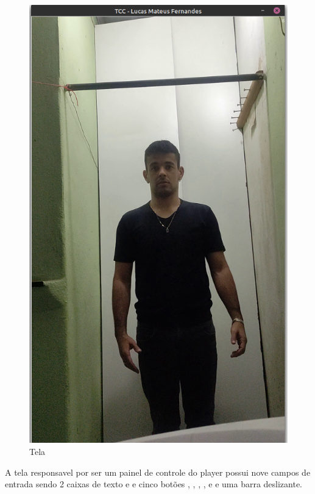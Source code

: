 \begin{figure}[H]
	\centering
	\caption{Tela }
	\includegraphics[scale=0.25]{figuras/view/player.png}
\end{figure}


A tela responsavel por ser um painel de controle do player possui nove campos de entrada sendo  2 caixas de texto   e  e cinco botões , , , ,  e  e uma barra deslizante. 


